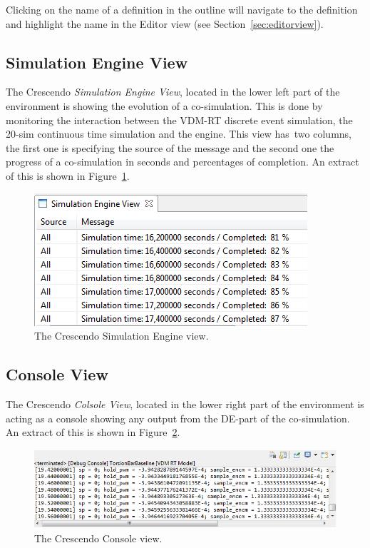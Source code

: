 \documentclass{crescendorepchap}
\begin{document}
Clicking on the name of a definition in the outline will navigate to
the definition and highlight the name in the Editor view (see Section~\ref{sec:editorview}).

\subsection{Simulation Engine View}

The Crescendo \emph{Simulation Engine View}, located in the lower left part of the
environment is showing the evolution of a co-simulation. This is done by
monitoring the interaction between the VDM-RT discrete event simulation,
the 20-sim continuous time simulation and the engine. This view has~two
columns, the first one is specifying the source of the message and the
second one the progress of a co-simulation in seconds and percentages of completion.
An extract of this is shown in Figure~\ref{fig:engineview}.

\begin{figure}[htbp]
\centering
\includegraphics[width=.6\textwidth]{images/DestecsEngineView.png}
\caption{The Crescendo Simulation Engine view.\label{fig:engineview}}
\end{figure}

\subsection{Console View}

The Crescendo \emph{Colsole View}, located in the lower right part of the
environment is acting as a console showing any output from the DE-part of
the co-simulation.
An extract of this is shown in Figure~\ref{fig:consoleview}.

\begin{figure}[htbp]
\centering
\includegraphics[width=.6\textwidth]{images/DestecsConsoleView.png}
\caption{The Crescendo Console view.\label{fig:consoleview}}
\end{figure}
\end{document}
